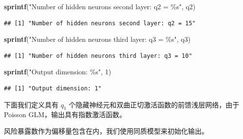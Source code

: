 \documentclass[
]{article}
\newenvironment{Shaded}{\begin{snugshade}}{\end{snugshade}}
\newcommand{\DecValTok}[1]{\textcolor[rgb]{0.00,0.00,0.81}{#1}}
\newcommand{\FunctionTok}[1]{\textcolor[rgb]{0.13,0.29,0.53}{\textbf{#1}}}
\newcommand{\NormalTok}[1]{#1}
\newcommand{\StringTok}[1]{\textcolor[rgb]{0.31,0.60,0.02}{#1}}
\begin{document}
\begin{Shaded}
\begin{Highlighting}[]
\FunctionTok{sprintf}\NormalTok{(}\StringTok{"Number of hidden neurons second layer: q2 = \%s"}\NormalTok{, q2)}
\end{Highlighting}
\end{Shaded}

\begin{verbatim}
## [1] "Number of hidden neurons second layer: q2 = 15"
\end{verbatim}

\begin{Shaded}
\begin{Highlighting}[]
\FunctionTok{sprintf}\NormalTok{(}\StringTok{"Number of hidden neurons third layer: q3 = \%s"}\NormalTok{, q3)}
\end{Highlighting}
\end{Shaded}

\begin{verbatim}
## [1] "Number of hidden neurons third layer: q3 = 10"
\end{verbatim}

\begin{Shaded}
\begin{Highlighting}[]
\FunctionTok{sprintf}\NormalTok{(}\StringTok{"Output dimension: \%s"}\NormalTok{, }\DecValTok{1}\NormalTok{)}
\end{Highlighting}
\end{Shaded}

\begin{verbatim}
## [1] "Output dimension: 1"
\end{verbatim}

下面我们定义具有 \(q_1\)
个隐藏神经元和双曲正切激活函数的前馈浅层网络，由于 Poisson
GLM，输出具有指数激活函数。

风险暴露数作为偏移量包含在内，我们使用同质模型来初始化输出。
\end{document}
